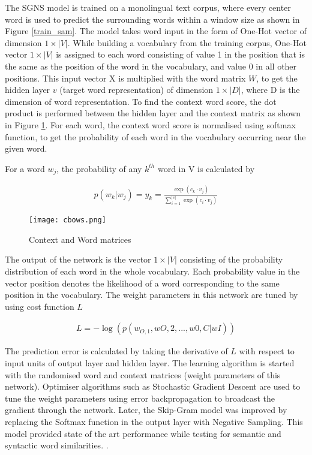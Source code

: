 \documentclass[12pt]{report} %
\begin{document}
The SGNS model is trained on a monolingual text corpus, where every center word is used to predict the surrounding words within a window size as shown  in Figure \ref{train_sam}.
The model takes word input in the form of One-Hot vector of dimension $1\times|V|$. While building a vocabulary from the training corpus, One-Hot vector $1\times|V|$ is assigned to each word consisting of value 1 in the position that is the same as the position of the word in the vocabulary, and value 0 in all other positions. This input vector X is multiplied with the word matrix $W$, to get the hidden layer $v$ (target word representation) of dimension $1\times|D|$, where D is the dimension of word representation. To find the context word score, the dot product is performed between the hidden layer and the context matrix as shown in Figure \ref{C_W_matrics}. For each word, the context word score is normalised using softmax function, to get the probability of each word in the vocabulary occurring near the given word. 



For a word $w_{j}$, the probability of any $k^{th}$ word in V is calculated by

\begin{align}
p(w_{k} | w_{j}) = y_{k} = \frac{\exp( c_{k} \cdot v_{j})}{\sum_{i=1}^{|v|} \exp(c_{i} \cdot v_{j}) }
\end{align}

\begin{figure}[!tbp]
	\centering
	\texttt{[image: cbows.png]}
	\caption{Context and Word matrices \citep{jurafsky2014speech}}
	\label{C_W_matrics}
\end{figure}

The output of the network is the vector $1\times|V|$ consisting of the probability distribution of each word in the whole vocabulary. Each probability value in the vector position denotes the likelihood of a word corresponding to the same position in the vocabulary. The weight parameters in this network are tuned by using cost function $L$

\begin{align}
L = - \log ( p(w_{O,1}, wO,2, . . . , w0,C|wI))
\end{align} 

The prediction error is calculated by taking the derivative of $L$ with respect to input units of output layer and hidden layer. The learning algorithm is started with the randomised word and context matrices (weight parameters of this network). Optimiser algorithms such as Stochastic Gradient Descent are used to tune the weight parameters using error backpropagation to broadcast the gradient through the network. Later, the Skip-Gram model was improved by replacing the Softmax function in the output layer with Negative Sampling. This model provided state of the art performance while testing for semantic and syntactic word similarities. \citep{mikolov2014word2vec}. 
\end{document}
